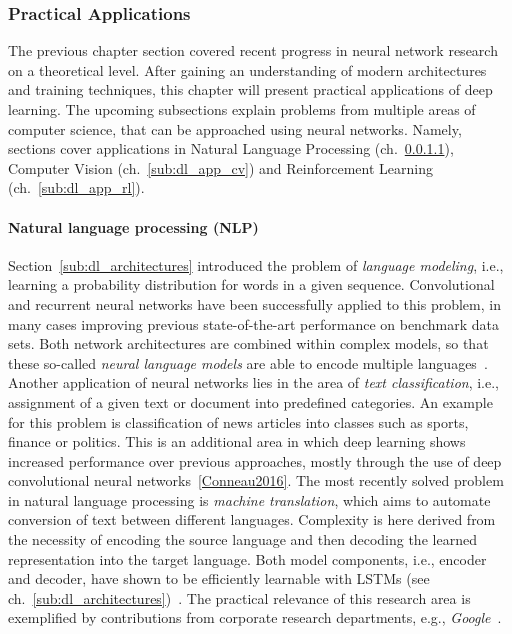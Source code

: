 \subsubsection{Practical Applications}
\label{sub:dl_applications}

The previous chapter section covered recent progress in neural network research
on a theoretical level.
After gaining an understanding of modern architectures and training techniques,
this chapter will present practical applications of deep learning.
The upcoming subsections explain problems from multiple areas of computer
science, that can be approached using neural networks.
Namely, sections cover applications in Natural Language Processing (ch.~\ref{sub:dl_app_nlp}),
Computer Vision (ch.~\ref{sub:dl_app_cv}) and Reinforcement Learning (ch.~\ref{sub:dl_app_rl}).

\paragraph{Natural language processing (NLP)}
\label{sub:dl_app_nlp}

Section~\ref{sub:dl_architectures} introduced the problem of \textit{language modeling},
i.e., learning a probability distribution for words in a given sequence.
Convolutional and recurrent neural networks have been successfully applied to
this problem, in many cases improving previous state-of-the-art performance
on benchmark data sets.
Both network architectures are combined within complex models, so that these
so-called \textit{neural language models} are able to encode multiple
languages~\cite{Kim2015}.
Another application of neural networks lies in the area of \textit{text classification},
i.e., assignment of a given text or document into predefined categories.
An example for this problem is classification of news articles into classes such
as sports, finance or politics.
This is an additional area in which deep learning shows increased performance
over previous approaches, mostly through the use of deep convolutional neural
networks~\ref{Conneau2016}.
The most recently solved problem in natural language processing is \textit{machine
translation}, which aims to automate conversion of text between different
languages.
Complexity is here derived from the necessity of encoding the source language and
then decoding the learned representation into the target language.
Both model components, i.e., encoder and decoder, have shown to be efficiently
learnable with LSTMs (see ch.~\ref{sub:dl_architectures})~\cite{Sutskever2014}.
The practical relevance of this research area is exemplified by contributions
from corporate research departments, e.g., \textit{Google}~\cite{Wu2016}.

